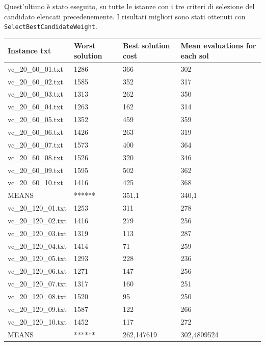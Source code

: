 \documentclass[11pt]{article}
\begin{document}
Quest'ultimo è stato eseguito, su tutte le istanze con i tre criteri di selezione del candidato elencati precedenemente. 
I risultati migliori sono stati ottenuti con \verb|SelectBestCandidateWeight|.

\begin{table}[!ht]
    \centering
    \begin{tabular}{|l|l|l|l|}
    \hline
        Instance txt & Worst solution & Best solution cost & Mean evaluations for each sol \\ \hline
        vc\_20\_60\_01.txt & 1286 & 366 & 302 \\ \hline
        vc\_20\_60\_02.txt & 1585 & 352 & 317 \\ \hline
        vc\_20\_60\_03.txt & 1313 & 262 & 350 \\ \hline
        vc\_20\_60\_04.txt & 1263 & 162 & 314 \\ \hline
        vc\_20\_60\_05.txt & 1352 & 459 & 359 \\ \hline
        vc\_20\_60\_06.txt & 1426 & 263 & 319 \\ \hline
        vc\_20\_60\_07.txt & 1573 & 400 & 364 \\ \hline
        vc\_20\_60\_08.txt & 1526 & 320 & 346 \\ \hline
        vc\_20\_60\_09.txt & 1595 & 502 & 362 \\ \hline
        vc\_20\_60\_10.txt & 1416 & 425 & 368 \\ \hline
        MEANS & ****** & 351,1 & 340,1 \\ \hline
        vc\_20\_120\_01.txt & 1253 & 311 & 278 \\ \hline
        vc\_20\_120\_02.txt & 1416 & 279 & 256 \\ \hline
        vc\_20\_120\_03.txt & 1319 & 113 & 287 \\ \hline
        vc\_20\_120\_04.txt & 1414 & 71 & 259 \\ \hline
        vc\_20\_120\_05.txt & 1293 & 228 & 236 \\ \hline
        vc\_20\_120\_06.txt & 1271 & 147 & 256 \\ \hline
        vc\_20\_120\_07.txt & 1317 & 160 & 251 \\ \hline
        vc\_20\_120\_08.txt & 1520 & 95 & 250 \\ \hline
        vc\_20\_120\_09.txt & 1587 & 122 & 266 \\ \hline
        vc\_20\_120\_10.txt & 1452 & 117 & 272 \\ \hline
        MEANS & ****** & 262,147619 & 302,4809524 \\ \hline

\end{tabular}
\end{table}
\end{document}
